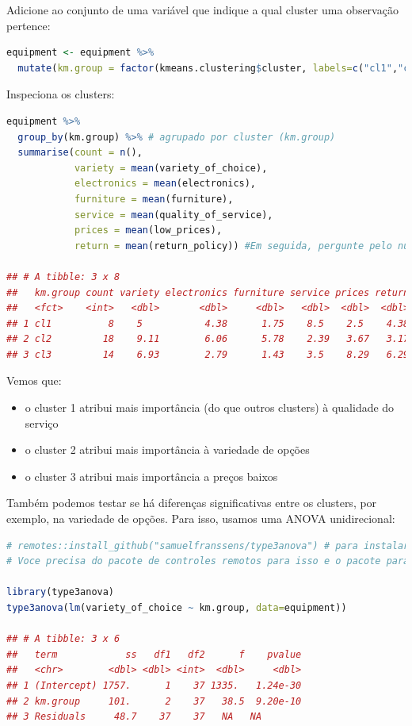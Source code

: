 \documentclass{article}
\begin{document}
Adicione ao conjunto de  uma variável que indique a qual cluster uma observação pertence:

\begin{lstlisting}[language=R]
equipment <- equipment %>% 
  mutate(km.group = factor(kmeans.clustering$cluster, labels=c("cl1","cl2","cl3"))) # Fatore o indicador de cluster a partir do quadro de dados clustering k e adicione-o ao quadro de dados do equipamento.
\end{lstlisting}

Inspeciona os clusters:
\begin{lstlisting}[language=R]
equipment %>% 
  group_by(km.group) %>% # agrupado por cluster (km.group)
  summarise(count = n(), 
            variety = mean(variety_of_choice), 
            electronics = mean(electronics), 
            furniture = mean(furniture), 
            service = mean(quality_of_service), 
            prices = mean(low_prices), 
            return = mean(return_policy)) #Em seguida, pergunte pelo número de entrevistados e pelos meios das classificações.
            
## # A tibble: 3 x 8
##   km.group count variety electronics furniture service prices return
##   <fct>    <int>   <dbl>       <dbl>     <dbl>   <dbl>  <dbl>  <dbl>
## 1 cl1          8    5           4.38      1.75    8.5    2.5    4.38
## 2 cl2         18    9.11        6.06      5.78    2.39   3.67   3.17
## 3 cl3         14    6.93        2.79      1.43    3.5    8.29   6.29
\end{lstlisting}

Vemos que:
\begin{itemize}
    \item o cluster 1 atribui mais importância (do que outros clusters) à qualidade do serviço
    \item o cluster 2 atribui mais importância à variedade de opções
    \item o cluster 3 atribui mais importância a preços baixos
\end{itemize}

Também podemos testar se há diferenças significativas entre os clusters, por exemplo, na variedade de opções. Para isso, usamos uma ANOVA unidirecional:

\begin{lstlisting}[language=R]
# remotes::install_github("samuelfranssens/type3anova") # para instalar o pacote type3anova.
# Voce precisa do pacote de controles remotos para isso e o pacote para carro precisa ser instalado para que o pacote type3anova funcione

library(type3anova)
type3anova(lm(variety_of_choice ~ km.group, data=equipment))

## # A tibble: 3 x 6
##   term            ss   df1   df2      f    pvalue
##   <chr>        <dbl> <dbl> <int>  <dbl>     <dbl>
## 1 (Intercept) 1757.      1    37 1335.   1.24e-30
## 2 km.group     101.      2    37   38.5  9.20e-10
## 3 Residuals     48.7    37    37   NA   NA
\end{lstlisting}
\end{document}
